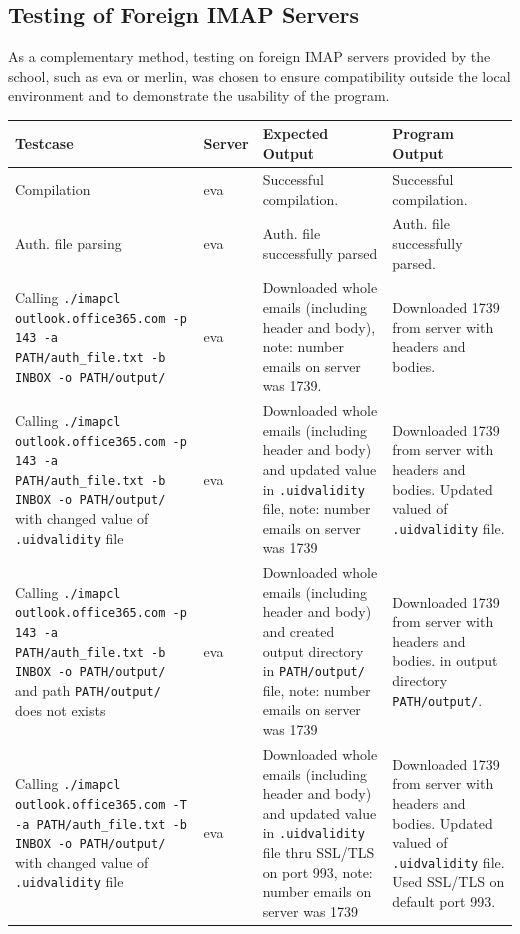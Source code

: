 \documentclass[a4paper,11pt]{article}
\begin{document}
\subsection{Testing of Foreign IMAP Servers}
As a complementary method, testing on foreign IMAP servers provided by the school, such as eva 
or merlin, was chosen to ensure compatibility outside the local environment and to demonstrate 
the usability of the program.

\begin{center}
    \vspace{0.5cm} %
    \begin{tabularx}{\textwidth}{|>{\raggedright\arraybackslash}p{5cm}|>{\raggedright\arraybackslash}p{1cm}|>{\raggedright\arraybackslash}p{5cm}|>{\raggedright\arraybackslash}X|}
        \hline
        \textbf{Testcase} & \textbf{Server} & \textbf{Expected Output} & \textbf{Program Output} \\
        \hline
        Compilation & eva & Successful compilation. & Successful compilation. \\
        \hline
        Auth. file parsing & eva & Auth. file successfully parsed & Auth. file successfully parsed. \\
        \hline
        Calling \texttt{./imapcl outlook.office365.com -p 143 -a PATH/auth\_file.txt -b INBOX -o PATH/output/} & eva & Downloaded whole emails (including header and body), note: number emails on server was 1739. & Downloaded 1739 from server with headers and bodies. \\
        \hline
        Calling \texttt{./imapcl outlook.office365.com -p 143 -a PATH/auth\_file.txt -b INBOX -o PATH/output/} with changed value of \texttt{.uidvalidity} file & eva & Downloaded whole emails (including header and body) and updated value in \texttt{.uidvalidity} file, note: number emails on server was 1739 & Downloaded 1739 from server with headers and bodies. Updated valued of \texttt{.uidvalidity} file. \\
        \hline
        Calling \texttt{./imapcl outlook.office365.com -p 143 -a PATH/auth\_file.txt -b INBOX -o PATH/output/} and path \texttt{PATH/output/} does not exists & eva & Downloaded whole emails (including header and body) and created output directory in \texttt{PATH/output/} file, note: number emails on server was 1739 & Downloaded 1739 from server with headers and bodies. in output directory \texttt{PATH/output/}. \\
        \hline
        Calling \texttt{./imapcl outlook.office365.com -T -a PATH/auth\_file.txt -b INBOX -o PATH/output/} with changed value of \texttt{.uidvalidity} file & eva & Downloaded whole emails (including header and body) and updated value in \texttt{.uidvalidity} file thru SSL/TLS on port 993, note: number emails on server was 1739 & Downloaded 1739 from server with headers and bodies. Updated valued of \texttt{.uidvalidity} file. Used SSL/TLS on default port 993.\\

\end{tabularx}
\end{center}
\end{document}
